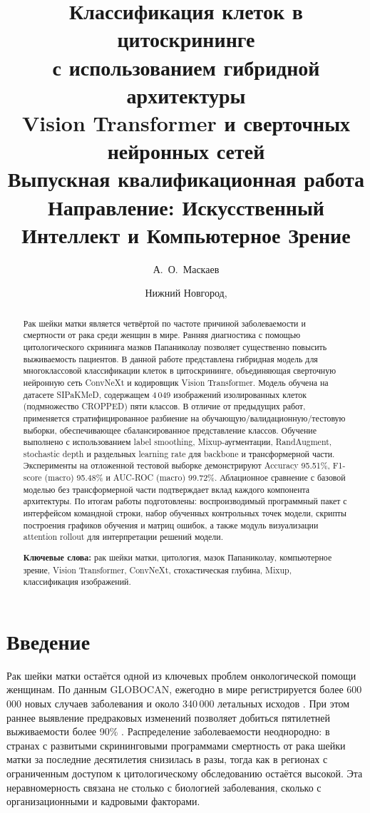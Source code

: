 \documentclass[14pt,a4paper]{extreport}
\title{
    \textbf{Классификация клеток в цитоскрининге\\
    с использованием гибридной архитектуры\\
    Vision Transformer и сверточных нейронных сетей}\\[1em]
    \large Выпускная квалификационная работа\\
    Направление: Искусственный Интеллект и Компьютерное Зрение
}
\author{А.~О.~Маскаев}
\date{Нижний Новгород, \the\year}
\begin{document}
\maketitle
\thispagestyle{empty}
\setcounter{page}{2}

\begin{abstract}
Рак шейки матки является четвёртой по частоте причиной заболеваемости и
смертности от рака среди женщин в мире. Ранняя диагностика с помощью
цитологического скрининга мазков Папаниколау позволяет существенно повысить
выживаемость пациентов. В данной работе представлена гибридная модель для
многоклассовой классификации клеток в цитоскрининге, объединяющая
сверточную нейронную сеть ConvNeXt и кодировщик Vision Transformer.
Модель обучена на датасете SIPaKMeD, содержащем 4\,049 изображений
изолированных клеток (подмножество CROPPED) пяти классов. В отличие от предыдущих работ, применяется стратифицированное
разбиение на обучающую/валидационную/тестовую выборки, обеспечивающее
сбалансированное представление классов. Обучение выполнено с использованием
label smoothing, Mixup-аугментации, RandAugment, stochastic depth и
раздельных learning rate для backbone и трансформерной части.
Эксперименты на отложенной тестовой выборке демонстрируют Accuracy 95.51\%,
F1-score (macro) 95.48\% и AUC-ROC (macro) 99.72\%. Аблационное сравнение
с базовой моделью без трансформерной части подтверждает вклад каждого
компонента архитектуры. По итогам работы подготовлены: воспроизводимый
программный пакет с интерфейсом командной строки, набор обученных
контрольных точек модели, скрипты построения графиков обучения и
матриц ошибок, а также модуль визуализации attention rollout для
интерпретации решений модели.

\textbf{Ключевые слова:} рак шейки матки, цитология, мазок Папаниколау,
компьютерное зрение, Vision Transformer, ConvNeXt, стохастическая глубина,
Mixup, классификация изображений.
\end{abstract}


\renewcommand{\contentsname}{Оглавление}
\tableofcontents
\clearpage

\chapter*{Введение}
\label{ch:intro}

Рак шейки матки остаётся одной из ключевых проблем онкологической
помощи женщинам. По данным GLOBOCAN, ежегодно в мире регистрируется более
600\,000 новых случаев заболевания и около 340\,000 летальных исходов
\cite{bray2018global}. При этом раннее выявление предраковых изменений
позволяет добиться пятилетней выживаемости более 90\% \cite{curry2018screening}.
Распределение заболеваемости неоднородно: в странах с развитыми скрининговыми
программами смертность от рака шейки матки за последние десятилетия снизилась в разы, тогда
как в регионах с ограниченным доступом к цитологическому обследованию остаётся
высокой. Эта неравномерность связана не столько с биологией заболевания,
сколько с организационными и кадровыми факторами.
\end{document}
